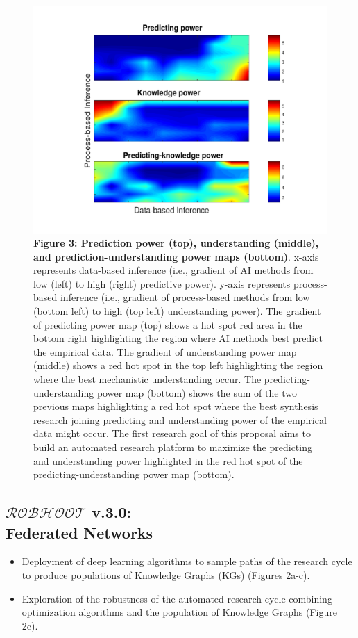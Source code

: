 \documentclass[12pt, a4paper]{article} %
\begin{document}
 \begin{figure}[h!]
\hspace{-0.2 in}\includegraphics[width=1\textwidth]{Figures/Figure3.pdf}
{\small {\bf Figure 3: Prediction power (top), understanding (middle),
    and prediction-understanding power maps (bottom)}. x-axis
  represents data-based inference (i.e., gradient of AI methods from
  low (left) to high (right) predictive power). y-axis represents
  process-based inference (i.e., gradient of process-based methods
  from low (bottom left) to high (top left) understanding power). The
  gradient of predicting power map (top) shows a hot spot red area in
  the bottom right highlighting the region where AI methods best
  predict the empirical data. The gradient of understanding power map
  (middle) shows a red hot spot in the top left highlighting the
  region where the best mechanistic understanding occur. The
  predicting-understanding power map (bottom) shows the sum of the two
  previous maps highlighting a red hot spot where the best synthesis
  research joining predicting and understanding power of the empirical
  data might occur. The first research goal of this proposal aims to
  build an automated research platform to maximize the predicting and
  understanding power highlighted in the red hot spot of the
  predicting-understanding power map (bottom).}
\end{figure}
  
  
  \subsection{{\bf $\mathcal{ROBHOOT}$ v.3.0}: \\ Federated Networks} 
  \begin{itemize}
  \item Deployment of deep learning algorithms to sample paths of the
    research cycle to produce populations of Knowledge Graphs (KGs)
    (Figures 2a-c).
  \item Exploration of the robustness of the automated research cycle
    combining optimization algorithms and the population of Knowledge
    Graphs (Figure 2c).
  \end{itemize}
\end{document}
